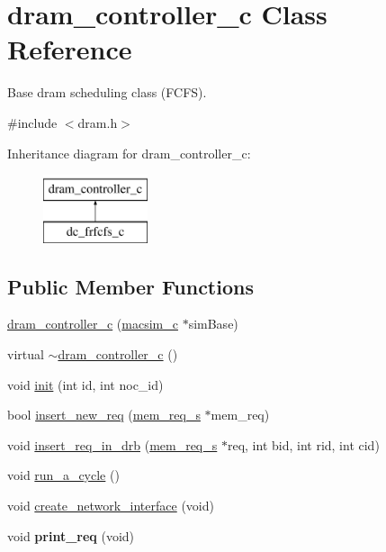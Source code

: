 \hypertarget{classdram__controller__c}{
\section{dram\_\-controller\_\-c Class Reference}
\label{classdram__controller__c}
}


Base dram scheduling class (FCFS).  




{\ttfamily \#include $<$dram.h$>$}

Inheritance diagram for dram\_\-controller\_\-c:\begin{figure}[H]
\begin{center}
\leavevmode
\includegraphics[height=2.000000cm]{classdram__controller__c}
\end{center}
\end{figure}
\subsection*{Public Member Functions}
\begin{DoxyCompactItemize}
\item 
\hyperlink{classdram__controller__c_a7248fd90d56110a6b7694546f9eb0d24}{dram\_\-controller\_\-c} (\hyperlink{classmacsim__c}{macsim\_\-c} $\ast$simBase)
\item 
virtual \hyperlink{classdram__controller__c_a1c1930981dac68e329b7fba36926fe4c}{$\sim$dram\_\-controller\_\-c} ()
\item 
void \hyperlink{classdram__controller__c_a6da28c92cae6664ba2850cb7940e8c26}{init} (int id, int noc\_\-id)
\item 
bool \hyperlink{classdram__controller__c_a49256d356f26730395d1f80ddbc4b9e6}{insert\_\-new\_\-req} (\hyperlink{structmem__req__s}{mem\_\-req\_\-s} $\ast$mem\_\-req)
\item 
void \hyperlink{classdram__controller__c_a7e9c891a53b54277e87564f4883adf4a}{insert\_\-req\_\-in\_\-drb} (\hyperlink{structmem__req__s}{mem\_\-req\_\-s} $\ast$req, int bid, int rid, int cid)
\item 
void \hyperlink{classdram__controller__c_a73581d9a96758d6f7fa8cc085a0cbddf}{run\_\-a\_\-cycle} ()
\item 
void \hyperlink{classdram__controller__c_aaff58a137e82a8096c8c66f58cdff99d}{create\_\-network\_\-interface} (void)
\item 
\hypertarget{classdram__controller__c_a26feec2184a215067af8e24839ab4044}{
void {\bfseries print\_\-req} (void)}
\label{classdram__controller__c_a26feec2184a215067af8e24839ab4044}

\end{DoxyCompactItemize}
